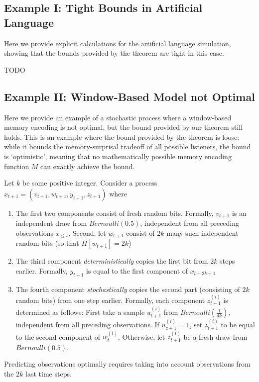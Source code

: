 \documentclass[11pt,letterpaper]{article}
\newcounter{theorem}
\begin{document}
\subsection{Example I: Tight Bounds in Artificial Language}

Here we provide explicit calculations for the artificial language simulation, showing that the bounds provided by the theorem are tight in this case.

TODO

\subsection{Example II: Window-Based Model not Optimal}

Here we provide an example of a stochastic process where a window-based memory encoding is not optimal, but the bound provided by our theorem still holds.
This is an example where the bound provided by the theorem is loose: while it bounds the memory-surprisal tradeoff of all possible listeners, the bound is `optimistic', meaning that no mathematically possible memory encoding function $M$ can exactly achieve the bound.

Let $k$ be some positive integer.
Consider a process
$x_{t+1} = (v_{t+1}, w_{t+1}, y_{t+1}, z_{t+1})$
where
\begin{enumerate}
	\item The first two components consist of fresh random bits. Formally, $v_{t+1}$ is an independent draw from $Bernoulli(0.5)$, independent from all preceding observations $x_{\leq t}$.
		Second, let $w_{t+1}$ consist of $2k$ many such independent random bits (so that $H[w_{t+1}] = 2k$)
	\item The third component \emph{deterministically} copies the first bit from $2k$ steps earlier. Formally, $y_{t+1}$ is equal to the first component of $x_{t-2k+1}$
	\item The fourth component \emph{stochastically} copies the second part (consisting of $2k$ random bits) from one step earlier. Formally, each component $z_{t+1}^{(i)}$ is determined as follows: First take a sample $u_{t+1}^{(i)}$ from $Bernoulli(\frac{1}{4k})$, independent from all preceding observations.
		If $u_{z+1}^{(i)}=1$, set $z_{t+1}^{(i)}$ to be equal to the second component of $w_{t}^{(i)}$.
		Otherwise, let $z_{t+1}^{(i)}$ be a fresh draw from $Bernoulli(0.5)$.
\end{enumerate}

Predicting observations optimally requires taking into account observations from the $2k$ last time steps.
\end{document}
